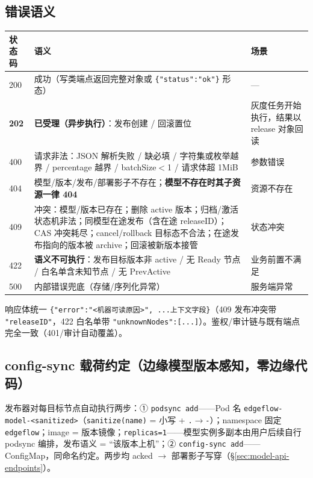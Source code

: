 \subsection{错误语义}
\label{sec:model-api-errors}

\begin{tabularx}{\textwidth}{l l X}
  \toprule
  \textbf{状态码} & \textbf{语义} & \textbf{场景} \\
  \midrule
  200 & 成功（写类端点返回完整对象或 \texttt{\{"status":"ok"\}} 形态） & — \\
  \textbf{202} & \textbf{已受理（异步执行）}：发布创建 / 回滚置位 & 灰度任务开始执行，结果以 release 对象回读 \\
  400 & 请求非法：JSON 解析失败 / 缺必填 / 字符集或枚举越界 / percentage 越界 / batchSize$<$1 / 请求体超 1MiB & 参数错误 \\
  404 & 模型/版本/发布/部署影子不存在；\textbf{模型不存在时其子资源一律 404} & 资源不存在 \\
  409 & 冲突：模型/版本已存在；删除 active 版本；归档/激活状态机非法；同模型在途发布（含在途 releaseID）；CAS 冲突耗尽；cancel/rollback 目标态不合法；在途发布指向的版本被 archive；回滚被新版本接管 & 状态冲突 \\
  422 & \textbf{语义不可执行}：发布目标版本非 active / 无 Ready 节点 / 白名单含未知节点 / 无 PrevActive & 业务前置不满足 \\
  500 & 内部错误兜底（存储/序列化异常） & 服务端异常 \\
  \bottomrule
\end{tabularx}

响应体统一 \texttt{\{"error":"<机器可读原因>", ...上下文字段\}}（409 发布冲突带 \texttt{"releaseID"}，422 白名单带 \texttt{"unknownNodes":[...]}）。鉴权/审计链与既有端点完全一致（401/审计自动覆盖）。

\subsection{config-sync 载荷约定（边缘模型版本感知，零边缘代码）}
\label{sec:model-api-configsync}

发布器对每目标节点自动执行两步：① \texttt{podsync add}——Pod 名 \texttt{edgeflow-model-<sanitized>}（\texttt{sanitize(name)} = 小写 + \texttt{.}$\rightarrow$\texttt{-}）；namespace 固定 \texttt{edgeflow}；image = 版本镜像；\texttt{replicas=1}——模型实例多副本由用户后续自行 podsync 编排，发布语义 = “该版本上机”；② \texttt{config-sync add}——ConfigMap，同命名约定。两步均 acked $\rightarrow$ 部署影子写穿（\S\ref{sec:model-api-endpoints}）。

